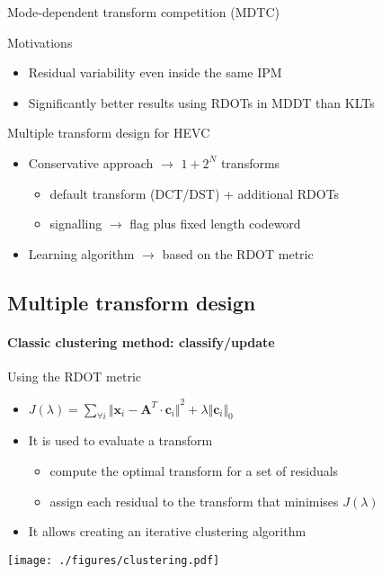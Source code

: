\documentclass[10pt]{beamer} %
\makeatletter
\newcommand*{\currentname}{\@currentlabelname}
\def\x{\mathbf{x}}
\def\c{\mathbf{c}}
\def\A{\mathbf{A}}
\makeatother
\begin{document}
\begin{frame}{Mode-dependent transform competition (MDTC)}
	\begin{block}{Motivations}
		\begin{itemize}
			\item Residual variability even inside the same IPM
			\item Significantly better results using RDOTs in MDDT than KLTs
		\end{itemize}
	\end{block}
	\begin{block}{Multiple transform design for HEVC}
		\begin{itemize}
			\item Conservative approach $\to$ $1+2^N$ transforms
				\begin{itemize}
					\item default transform (DCT/DST) + additional RDOTs
					\item signalling $\to$ flag plus fixed length codeword
				\end{itemize}
			\item Learning algorithm $\to$ based on the RDOT metric
		\end{itemize}
	\end{block}
\end{frame}

\subsection{Multiple transform design}
\begin{frame}{\currentname}
	\framesubtitle{Classic clustering method: classify/update}
	\begin{minipage}{0.49\textwidth}
		\small
		\begin{block}{Using the RDOT metric}
			\begin{itemize}
				\item $J(\lambda)=\displaystyle\sum_{\forall i}
					{\Vert\x_i-\A^T\cdot \c_i\Vert}^2
					+\lambda {\Vert\c_i\Vert}_0$
				\item It is used to evaluate a transform
					\begin{itemize}
						\scriptsize
						\item compute the optimal transform for a set of
							residuals
						\item assign each residual to the transform that
							minimises $J(\lambda)$
					\end{itemize}
				\item It allows creating an iterative clustering algorithm
			\end{itemize}
		\end{block}
	\end{minipage}
	\hfill
	\begin{minipage}{0.49\textwidth}
		\texttt{[image: ./figures/clustering.pdf]}
	\end{minipage}
\end{frame}
\end{document}
